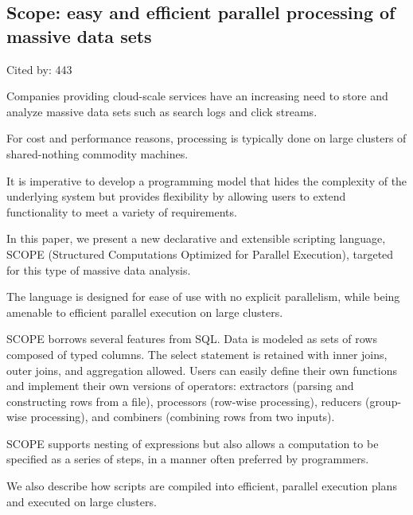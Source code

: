 \documentclass[a4paper,11pt]{article}
\begin{document}
\subsection*{Scope: easy and efficient parallel processing of massive data sets}
{\color{cyan} {\color{magenta} Cited by: 443}

Companies providing cloud-scale services 
have an increasing need to store and analyze massive data sets 
such as search logs and click streams. 

For cost and performance reasons, 
processing is typically done on 
large clusters of shared-nothing commodity machines. 

It is imperative to 
develop a programming model that 
hides the complexity of the underlying system but provides flexibility by 
allowing users to extend functionality to meet a variety of requirements.

In this paper,  
we present 
a new declarative and extensible scripting language, 
SCOPE (Structured Computations Optimized for Parallel Execution)\cite{cosmos-scope}, 
targeted for this type of massive data analysis.

The language is designed for ease of use with no explicit parallelism,
while being amenable to efficient parallel execution on large clusters. 

SCOPE borrows several features from SQL. 
Data is modeled as sets of rows composed of typed columns. 
The select statement is retained with inner joins, outer joins, and aggregation allowed. 
Users can easily define their own functions and implement their own versions of operators: 
extractors (parsing and constructing rows from a file), 
processors (row-wise processing),
reducers (group-wise processing), and 
combiners (combining rows from two inputs). 

SCOPE supports nesting of expressions
but also allows a computation to be specified as a series of steps,
in a manner often preferred by programmers. 

We also describe
how scripts are compiled into efficient, parallel execution plans and executed on large clusters.

}
\end{document}
